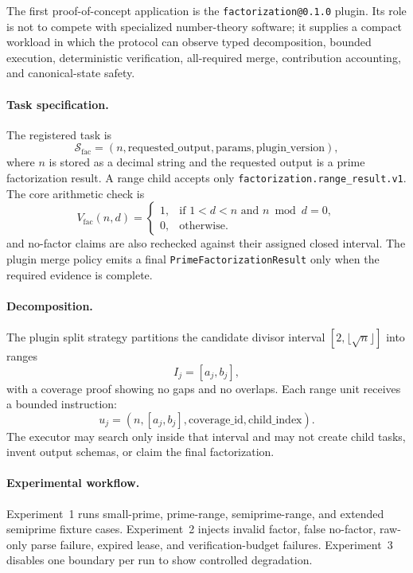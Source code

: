 \documentclass{article}
\theoremstyle{plain}
\begin{document}
{{\color{blue}
The first proof-of-concept application is the \texttt{factorization@0.1.0} plugin. Its role is not to compete with specialized number-theory software; it supplies a compact workload in which the protocol can observe typed decomposition, bounded execution, deterministic verification, all-required merge, contribution accounting, and canonical-state safety.
}

\paragraph{Task specification.}
{\color{blue}
The registered task is
\[
\mathcal{S}_{\mathrm{fac}}=(n,\mathrm{requested\_output},\mathrm{params},\mathrm{plugin\_version}),
\]
where $n$ is stored as a decimal string and the requested output is a prime factorization result. A range child accepts only \texttt{factorization.range\_result.v1}. The core arithmetic check is
\[
V_{\mathrm{fac}}(n,d)=
\begin{cases}
1, & \text{if } 1<d<n \text{ and } n\bmod d=0,\\
0, & \text{otherwise}.
\end{cases}
\]
and no-factor claims are also rechecked against their assigned closed interval. The plugin merge policy emits a final \texttt{PrimeFactorizationResult} only when the required evidence is complete.
}

\paragraph{Decomposition.}
{\color{blue}
The plugin split strategy partitions the candidate divisor interval $[2,\lfloor \sqrt{n}\rfloor]$ into ranges
\[
I_j=[a_j,b_j],
\]
with a coverage proof showing no gaps and no overlaps. Each range unit receives a bounded instruction:
\[
u_j=(n,[a_j,b_j],\mathrm{coverage\_id},\mathrm{child\_index}).
\]
The executor may search only inside that interval and may not create child tasks, invent output schemas, or claim the final factorization.
}

\paragraph{Experimental workflow.}
{\color{blue}
Experiment~1 runs small-prime, prime-range, semiprime-range, and extended semiprime fixture cases. Experiment~2 injects invalid factor, false no-factor, raw-only parse failure, expired lease, and verification-budget failures. Experiment~3 disables one boundary per run to show controlled degradation.
}

}
\end{document}
